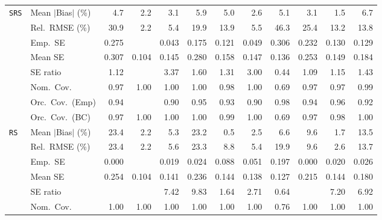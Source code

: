 \begin{landscape}
\begin{longtable}{llrrrrrrrrrr}
\addlinespace[2pt]
\quad \texttt{SRS} & Mean $|$Bias$|$ (\%) & 4.7 & \cellcolor{ranktwo}2.2 & 3.1 & 5.9 & 5.0 & \cellcolor{rankthree}2.6 & 5.1 & 3.1 & \cellcolor{rankone}1.5 & 6.7 \\
 & Rel.\ RMSE (\%) & 30.9 & \cellcolor{rankone}2.2 & \cellcolor{ranktwo}5.4 & 19.9 & 13.9 & \cellcolor{rankthree}5.5 & 46.3 & 25.4 & 13.2 & 13.8 \\
 & Emp.\ SE & 0.275 &  & 0.043 & 0.175 & 0.121 & 0.049 & 0.306 & 0.232 & 0.130 & 0.129 \\
 & Mean SE & 0.307 & 0.104 & 0.145 & 0.280 & 0.158 & 0.147 & 0.136 & 0.253 & 0.149 & 0.184 \\
 & SE ratio & \cellcolor{ranktwo}1.12 &  & 3.37 & 1.60 & 1.31 & 3.00 & 0.44 & \cellcolor{rankone}1.09 & \cellcolor{rankthree}1.15 & 1.43 \\
 & Nom.\ Cov. & \cellcolor{rankone}0.97 & 1.00 & 1.00 & 1.00 & \cellcolor{ranktwo}0.98 & 1.00 & 0.69 & \cellcolor{rankone}0.97 & \cellcolor{rankone}0.97 & \cellcolor{rankthree}0.99 \\
 & Orc.\ Cov.\ (Emp) & \cellcolor{ranktwo}0.94 &  & 0.90 & \cellcolor{rankone}0.95 & \cellcolor{rankthree}0.93 & 0.90 & 0.98 & \cellcolor{ranktwo}0.94 & \cellcolor{ranktwo}0.96 & 0.92 \\
 & Orc.\ Cov.\ (BC) & \cellcolor{rankone}0.97 & 1.00 & 1.00 & 1.00 & \cellcolor{rankthree}0.99 & 1.00 & 0.69 & \cellcolor{rankone}0.97 & \cellcolor{ranktwo}0.98 & 1.00 \\
\addlinespace[2pt]
\quad \texttt{RS} & Mean $|$Bias$|$ (\%) & 23.4 & \cellcolor{rankthree}2.2 & 5.3 & 23.2 & \cellcolor{rankone}0.5 & 2.5 & 6.6 & 9.6 & \cellcolor{ranktwo}1.7 & 13.5 \\
 & Rel.\ RMSE (\%) & 23.4 & \cellcolor{rankone}2.2 & 5.6 & 23.3 & 8.8 & \cellcolor{rankthree}5.4 & 19.9 & 9.6 & \cellcolor{ranktwo}2.6 & 13.7 \\
 & Emp.\ SE & 0.000 &  & 0.019 & 0.024 & 0.088 & 0.051 & 0.197 & 0.000 & 0.020 & 0.026 \\
 & Mean SE & 0.254 & 0.104 & 0.141 & 0.236 & 0.144 & 0.138 & 0.127 & 0.215 & 0.144 & 0.180 \\
 & SE ratio &  &  & 7.42 & 9.83 & \cellcolor{ranktwo}1.64 & \cellcolor{rankthree}2.71 & \cellcolor{rankone}0.64 &  & 7.20 & 6.92 \\
 & Nom.\ Cov. & \cellcolor{rankone}1.00 & \cellcolor{rankone}1.00 & \cellcolor{rankone}1.00 & \cellcolor{rankone}1.00 & \cellcolor{rankone}1.00 & \cellcolor{rankone}1.00 & \cellcolor{ranktwo}0.76 & \cellcolor{rankone}1.00 & \cellcolor{rankone}1.00 & \cellcolor{rankone}1.00 \\

\end{longtable}
\end{landscape}
